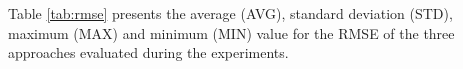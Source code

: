 \documentclass{acm_proc_article-sp}
\begin{document}
% 

% 


Table \ref{tab:rmse} presents the average (AVG), standard deviation (STD),
maximum (MAX) and minimum (MIN) value for the RMSE of the three approaches
evaluated during the experiments.
\end{document}
